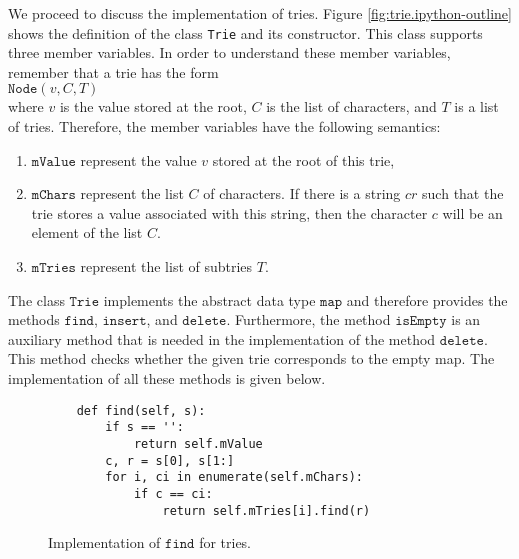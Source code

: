 \noindent
We proceed to discuss the implementation of tries.  Figure \ref{fig:trie.ipython-outline} shows the
definition of the class \texttt{Trie} and its constructor.  This class supports three member variables.  In order to
understand these member variables, remember that a trie has the form
\\[0.2cm]
\hspace*{1.3cm}
$\texttt{Node}(v, C, T)$
\\[0.2cm]
where $v$ is the value stored at the root, $C$ is the list of characters, and $T$ is a list of
tries.  Therefore, the member variables have the following semantics:
\begin{enumerate}
\item $\texttt{mValue}$ represent the value $v$ stored at the root of this trie,  
\item $\texttt{mChars}$ represent the list  $C$ of characters.  If there is a string $cr$ such that
      the trie stores a value associated with this string, then the character $c$ will be an element of
      the list $C$.
\item $\texttt{mTries}$ represent the list of subtries $T$.  
\end{enumerate}
The class $\texttt{Trie}$ implements the abstract data type $\texttt{map}$ and therefore provides the
methods $\texttt{find}$, $\texttt{insert}$, and $\texttt{delete}$.  Furthermore, the method
$\texttt{isEmpty}$ is an auxiliary method that is needed in the implementation of the method 
$\texttt{delete}$.  This method checks whether the given trie corresponds to the empty map.  The
implementation of all these methods is given below. 

\begin{figure}[!ht]
\centering
\begin{verbatim}
    def find(self, s):
        if s == '':
            return self.mValue
        c, r = s[0], s[1:]
        for i, ci in enumerate(self.mChars):
            if c == ci:
                return self.mTries[i].find(r)
\end{verbatim}
\vspace*{-0.3cm}
\caption{Implementation of $\texttt{find}$ for tries.}
\label{fig:trie.ipython-find}
\end{figure}

